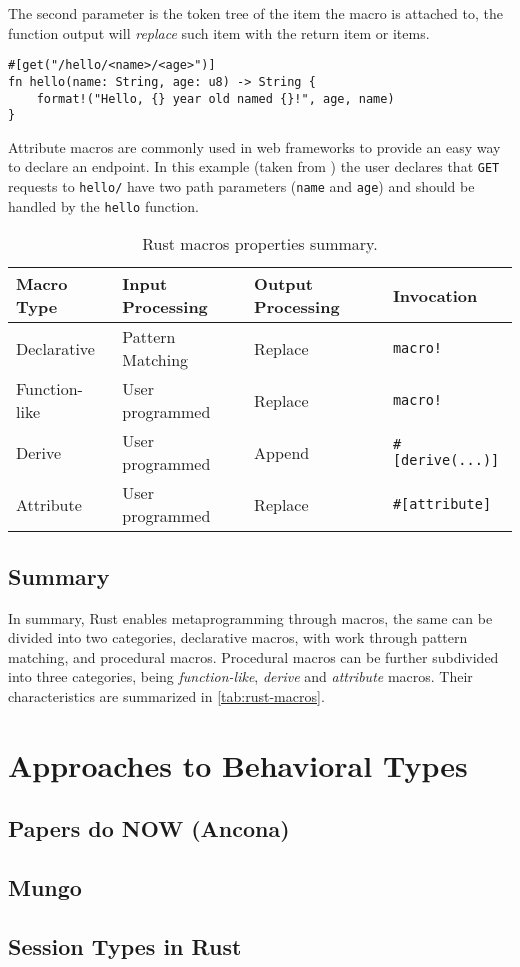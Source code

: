 The second parameter is the token tree of the item the macro is attached to,
the function output will \emph{replace} such item with the return item or items.


\begin{listing}
    \centering
    \begin{verbatim}
#[get("/hello/<name>/<age>")]
fn hello(name: String, age: u8) -> String {
    format!("Hello, {} year old named {}!", age, name)
}
    \end{verbatim}
    \caption{
        Attribute macros are commonly used in web frameworks to provide an easy way to declare an endpoint.
        In this example (taken from \autocite{Rocket2021}) the user declares that \texttt{GET} requests to \texttt{hello/}
        have two path parameters (\texttt{name} and \texttt{age}) and should be handled by the \texttt{hello} function.
    }
    \label{lst:rust-rocket-attr}
\end{listing}

\begin{table}
    \centering
    \begin{tabular}{l|l|l|l}
        Macro Type    & Input Processing & Output Processing & Invocation                 \\
        \hline
        Declarative   & Pattern Matching & Replace           & \texttt{macro!}            \\
        Function-like & User programmed  & Replace           & \texttt{macro!}            \\
        Derive        & User programmed  & Append            & \texttt{\#{[}derive(...)]} \\
        Attribute     & User programmed  & Replace           & \texttt{\#{[}attribute]}
    \end{tabular}
    \caption{Rust macros properties summary.}
    \label{tab:rust-macros}
\end{table}

\subsection{Summary}
In summary, Rust enables metaprogramming through macros, the same can be divided into two categories,
declarative macros, with work through pattern matching, and procedural macros.
Procedural macros can be further subdivided into three categories,
being \emph{function-like}, \emph{derive} and \emph{attribute} macros.
Their characteristics are summarized in \autoref{tab:rust-macros}.

\section{Approaches to Behavioral Types}

\subsection{Papers do NOW (Ancona)}

\subsection{Mungo}

\subsection{Session Types in Rust}